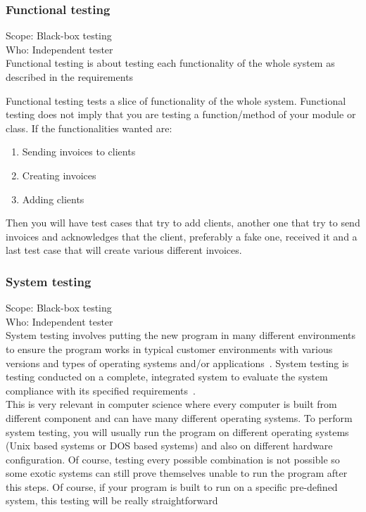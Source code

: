 \documentclass[12pt]{article}
\begin{document}
\subsubsection{Functional testing}

Scope: Black-box testing\\
Who: Independent tester\\

Functional testing is about testing each functionality of the whole system as described in the requirements

Functional testing tests a slice of functionality of the whole system. Functional testing does not imply that you are testing a function/method of your module or class. If the functionalities wanted are:
\begin{enumerate}
\item Sending invoices to clients
\item Creating invoices
\item Adding clients
\end{enumerate}

Then you will have test cases that try to add clients, another one that try to send invoices and acknowledges that the client, preferably a fake one, received it and a last test case that will create various different invoices.

\subsubsection{System testing}

Scope: Black-box testing\\
Who: Independent tester\\

System testing involves putting the new program in many different environments to ensure the program works in typical customer environments with various versions and types of operating systems and/or applications~\cite{Laurie.W:Black-box}. System testing is testing conducted on a complete, integrated system to evaluate the
system compliance with its specified requirements~\cite{IEEEStd1990}.\\

This is very relevant in computer science where every computer is built from different component and can have many different operating systems. To perform system testing, you will usually run the program on different operating systems (Unix based systems or DOS based systems) and also on different hardware configuration. Of course, testing every possible combination is not possible so some exotic systems can still prove themselves unable to run the program after this steps. Of course, if your program is built to run on a specific pre-defined system, this testing will be really straightforward
\end{document}
